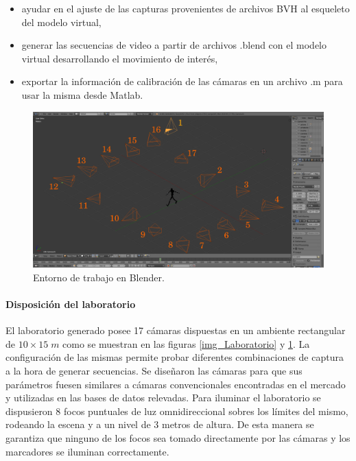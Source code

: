 \begin{itemize}
\item  ayudar en  el ajuste de las capturas provenientes de archivos BVH al esqueleto del modelo virtual,
\item	generar las secuencias de video a partir de archivos .blend  con el modelo virtual desarrollando el movimiento de interés,
\item	exportar la información de calibración de las cámaras en un archivo .m para usar la misma desde Matlab.
\end{itemize}


\begin{figure}[!ht]
  \centering 
   \includegraphics[scale=0.3]{img/Base_Datos/Entorno_Blender.pdf}
   \caption{Entorno de trabajo en Blender.}
  \label{img_Entorno_Blender}
\end{figure}   


\paragraph{Disposición del laboratorio}
El laboratorio generado posee 17 cámaras dispuestas en un ambiente rectangular de $10\times15\;m $ como se muestran en las figuras \ref{img_Laboratorio} y \ref{img_Entorno_Blender}. La configuración de las mismas permite probar diferentes combinaciones de captura a la hora de generar secuencias. Se diseñaron las cámaras para que sus parámetros fuesen similares a cámaras convencionales
 encontradas en el mercado y utilizadas en las bases de datos relevadas. 
Para iluminar el laboratorio se dispusieron $8$ focos puntuales de luz omnidireccional sobres los límites del mismo, rodeando la escena y a un nivel de 3 metros de altura. De esta manera se garantiza que ninguno de los focos sea tomado directamente por las cámaras y los marcadores se iluminan correctamente.
 


